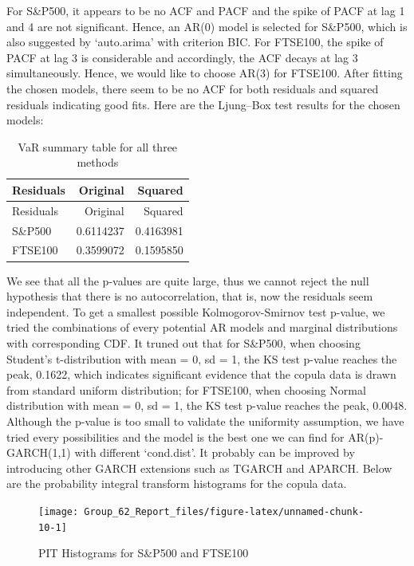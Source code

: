 \documentclass[]{article}
\begin{document}
For S\&P500, it appears to be no ACF and PACF and the spike of PACF at
lag 1 and 4 are not significant. Hence, an AR(0) model is selected for
S\&P500, which is also suggested by `auto.arima' with criterion BIC. For
FTSE100, the spike of PACF at lag 3 is considerable and accordingly, the
ACF decays at lag 3 simultaneously. Hence, we would like to choose AR(3)
for FTSE100. After fitting the chosen models, there seem to be no ACF
for both residuals and squared residuals indicating good fits. Here are
the Ljung--Box test results for the chosen models:

\begin{longtable}[]{@{}lrr@{}}
\caption{VaR summary table for all three methods}\tabularnewline
\toprule
Residuals & Original & Squared\tabularnewline
\midrule
\endfirsthead
\toprule
Residuals & Original & Squared\tabularnewline
\midrule
\endhead
S\&P500 & 0.6114237 & 0.4163981\tabularnewline
FTSE100 & 0.3599072 & 0.1595850\tabularnewline
\bottomrule
\end{longtable}

We see that all the p-values are quite large, thus we cannot reject the
null hypothesis that there is no autocorrelation, that is, now the
residuals seem independent. To get a smallest possible
Kolmogorov-Smirnov test p-value, we tried the combinations of every
potential AR models and marginal distributions with corresponding CDF.
It truned out that for S\&P500, when choosing Student's t-distribution
with mean = 0, sd = 1, the KS test p-value reaches the peak, 0.1622,
which indicates significant evidence that the copula data is drawn from
standard uniform distribution; for FTSE100, when choosing Normal
distribution with mean = 0, sd = 1, the KS test p-value reaches the
peak, 0.0048. Although the p-value is too small to validate the
uniformity assumption, we have tried every possibilities and the model
is the best one we can find for AR(p)-GARCH(1,1) with different
`cond.dist'. It probably can be improved by introducing other GARCH
extensions such as TGARCH and APARCH. Below are the probability integral
transform histograms for the copula data.

\begin{figure}

{\centering \texttt{[image: Group\_62\_Report\_files/figure-latex/unnamed-chunk-10-1]} 

}

\caption{PIT Histograms for S\&P500 and FTSE100}\label{fig:unnamed-chunk-10}
\end{figure}
\end{document}

